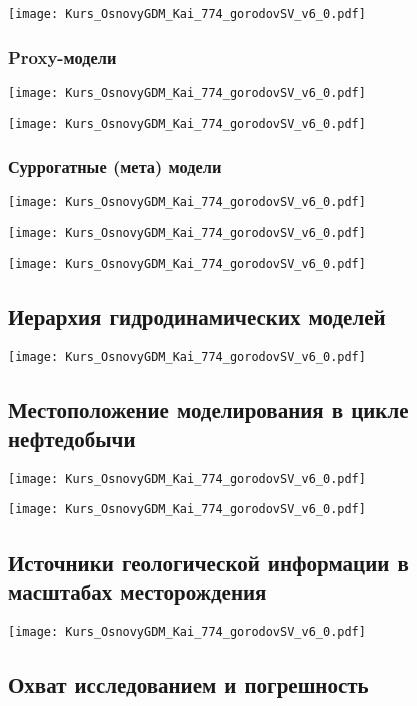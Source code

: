 \documentclass[main.tex]{subfiles}
\begin{document}
\texttt{[image: Kurs\_OsnovyGDM\_Kai\_774\_gorodovSV\_v6\_0.pdf]}

\subsubsection{Proxy-модели}

\texttt{[image: Kurs\_OsnovyGDM\_Kai\_774\_gorodovSV\_v6\_0.pdf]}

\texttt{[image: Kurs\_OsnovyGDM\_Kai\_774\_gorodovSV\_v6\_0.pdf]}

\subsubsection{Суррогатные (мета) модели}

\texttt{[image: Kurs\_OsnovyGDM\_Kai\_774\_gorodovSV\_v6\_0.pdf]}

\texttt{[image: Kurs\_OsnovyGDM\_Kai\_774\_gorodovSV\_v6\_0.pdf]}

\texttt{[image: Kurs\_OsnovyGDM\_Kai\_774\_gorodovSV\_v6\_0.pdf]}

\subsection{Иерархия гидродинамических моделей}

\texttt{[image: Kurs\_OsnovyGDM\_Kai\_774\_gorodovSV\_v6\_0.pdf]}

\subsection{Местоположение моделирования в цикле нефтедобычи}

\texttt{[image: Kurs\_OsnovyGDM\_Kai\_774\_gorodovSV\_v6\_0.pdf]}

\texttt{[image: Kurs\_OsnovyGDM\_Kai\_774\_gorodovSV\_v6\_0.pdf]}

\subsection{Источники геологической информации в масштабах месторождения}

\texttt{[image: Kurs\_OsnovyGDM\_Kai\_774\_gorodovSV\_v6\_0.pdf]}

\subsection{Охват исследованием и погрешность}
\end{document}
